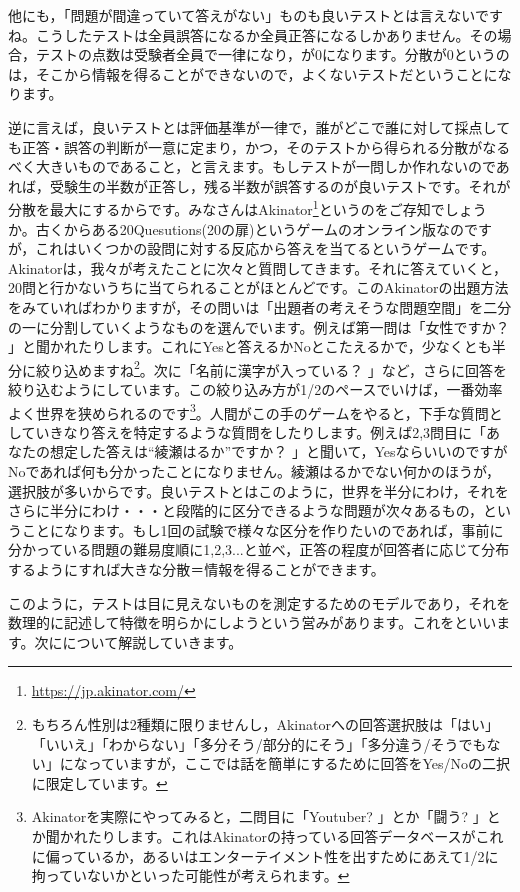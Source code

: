 \documentclass{ltjbook}
\begin{document}
他にも，「問題が間違っていて答えがない」ものも良いテストとは言えないですね。こうしたテストは全員誤答になるか全員正答になるしかありません。その場合，テストの点数は受験者全員で一律になり，が$0$になります。分散が$0$というのは，そこから情報を得ることができないので，よくないテストだということになります。

逆に言えば，良いテストとは評価基準が一律で，誰がどこで誰に対して採点しても正答・誤答の判断が一意に定まり，かつ，そのテストから得られる分散がなるべく大きいものであること，と言えます。もしテストが一問しか作れないのであれば，受験生の半数が正答し，残る半数が誤答するのが良いテストです。それが分散を最大にするからです。みなさんはAkinator\footnote{\url{https://jp.akinator.com/}}というのをご存知でしょうか。古くからある20Quesutions(20の扉)というゲームのオンライン版なのですが，これはいくつかの設問に対する反応から答えを当てるというゲームです。Akinatorは，我々が考えたことに次々と質問してきます。それに答えていくと，20問と行かないうちに当てられることがほとんどです。このAkinatorの出題方法をみていればわかりますが，その問いは「出題者の考えそうな問題空間」を二分の一に分割していくようなものを選んでいます。例えば第一問は「女性ですか？ 」と聞かれたりします。これにYesと答えるかNoとこたえるかで，少なくとも半分に絞り込めますね\footnote{もちろん性別は2種類に限りませんし，Akinatorへの回答選択肢は「はい」「いいえ」「わからない」「多分そう/部分的にそう」「多分違う/そうでもない」になっていますが，ここでは話を簡単にするために回答をYes/Noの二択に限定しています。}。次に「名前に漢字が入っている？ 」など，さらに回答を絞り込むようにしています。この絞り込み方が1/2のペースでいけば，一番効率よく世界を狭められるのです\footnote{Akinatorを実際にやってみると，二問目に「Youtuber? 」とか「闘う? 」とか聞かれたりします。これはAkinatorの持っている回答データベースがこれに偏っているか，あるいはエンターテイメント性を出すためにあえて1/2に拘っていないかといった可能性が考えられます。}。人間がこの手のゲームをやると，下手な質問としていきなり答えを特定するような質問をしたりします。例えば2,3問目に「あなたの想定した答えは``綾瀬はるか''ですか？ 」と聞いて，YesならいいのですがNoであれば何も分かったことになりません。綾瀬はるかでない何かのほうが，選択肢が多いからです。良いテストとはこのように，世界を半分にわけ，それをさらに半分にわけ・・・と段階的に区分できるような問題が次々あるもの，ということになります。もし1回の試験で様々な区分を作りたいのであれば，事前に分かっている問題の難易度順に1,2,3...と並べ，正答の程度が回答者に応じて分布するようにすれば大きな分散＝情報を得ることができます。

このように，テストは目に見えないものを測定するためのモデルであり，それを数理的に記述して特徴を明らかにしようという営みがあります。これをといいます。次にについて解説していきます。
\end{document}
